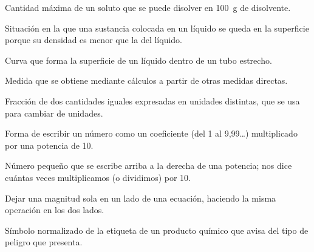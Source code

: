 \begin{vocabulary}
    Cantidad máxima de un soluto que se puede disolver en \qty{100}{\g} de disolvente.
\end{vocabulary}

\begin{vocabulary}
    Situación en la que una sustancia colocada en un líquido se queda en la superficie porque su densidad es menor que la del líquido.
\end{vocabulary}

\begin{vocabulary}
    Curva que forma la superficie de un líquido dentro de un tubo estrecho.
\end{vocabulary}

\begin{vocabulary}
    Medida que se obtiene mediante cálculos a partir de otras medidas directas.
\end{vocabulary}

\begin{vocabulary}
    Fracción de dos cantidades iguales expresadas en unidades distintas, que se usa para cambiar de unidades.
\end{vocabulary}

\begin{vocabulary}
    Forma de escribir un número como un coeficiente (del 1 al 9,99\ldots) multiplicado por una potencia de 10.
\end{vocabulary}

\begin{vocabulary}
    Número pequeño que se escribe arriba a la derecha de una potencia; nos dice cuántas veces multiplicamos (o dividimos) por 10.
\end{vocabulary}

\begin{vocabulary}
    Dejar una magnitud sola en un lado de una ecuación, haciendo la misma operación en los dos lados.
\end{vocabulary}

\begin{vocabulary}
    Símbolo normalizado de la etiqueta de un producto químico que avisa del tipo de peligro que presenta.
\end{vocabulary}

